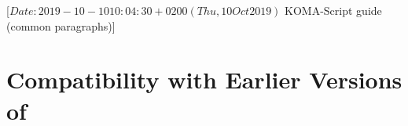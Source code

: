 %
%
%
%
%
%
%
%
% 
%
%
%
%

                 [$Date: 2019-10-10 10:04:30 +0200 (Thu, 10 Oct 2019) $
                  KOMA-Script guide (common paragraphs)]


\section{Compatibility with Earlier Versions of \KOMAScript}
\BeginIndexGroup
{}

